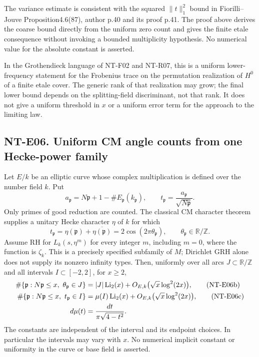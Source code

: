 The variance estimate is consistent with the squared
$\|t\|_1^2$ bound in Fiorilli--Jouve Proposition4.6(87),
author p.40 and its proof p.41. The proof above derives the
coarse bound directly from the uniform zero count and gives
the finite etale consequence without invoking a bounded
multiplicity hypothesis. No numerical value for the absolute
constant is asserted.

In the Grothendieck language of NT-F02 and NT-R07, this is a
uniform lower-frequency statement for the Frobenius trace on
the permutation realization of $H^0$ of a finite etale cover.
The generic rank of that realization may grow; the final lower
bound depends on the splitting-field discriminant, not that
rank. It does not give a uniform threshold in $x$ or a uniform
error term for the approach to the limiting law.

\subsection*{NT-E06. Uniform CM angle counts from one Hecke-power family}
Let $E/k$ be an elliptic curve whose complex multiplication is defined
over the number field $k$. Put
\[
 a_{\mathfrak p}=N\mathfrak p+1-\#E_{\mathfrak p}(k_{\mathfrak p}),
 \qquad t_{\mathfrak p}=\frac{a_{\mathfrak p}}{\sqrt{N\mathfrak p}}.
\]
Only primes of good reduction are counted. The classical CM character
theorem supplies a unitary Hecke character $\eta$ of $k$ for which
\[
 t_{\mathfrak p}=\eta(\mathfrak p)+\overline{\eta(\mathfrak p)}
                =2\cos(2\pi\theta_{\mathfrak p}),
 \qquad \theta_{\mathfrak p}\in\mathbb R/\mathbb Z.       \tag{NT-E06a}
\]
Assume RH for $L_k(s,\eta^m)$ for every integer $m$, including
$m=0$, where the function is $\zeta_k$. This is a precisely specified
subfamily of $M$; Dirichlet GRH alone does not supply its nonzero
infinity types. Then, uniformly over all arcs $J\subset\mathbb R/\mathbb Z$
and all intervals $I\subset[-2,2]$, for $x\ge2$,
\begin{align}
 \#\{\mathfrak p:N\mathfrak p\le x,\ \theta_{\mathfrak p}\in J\}
   &= |J|\operatorname{Li}_2(x)
       +O_{E,k}\bigl(\sqrt x\log^2(2x)\bigr), \tag{NT-E06b}\\
 \#\{\mathfrak p:N\mathfrak p\le x,\ t_{\mathfrak p}\in I\}
   &= \mu(I)\operatorname{Li}_2(x)
       +O_{E,k}\bigl(\sqrt x\log^2(2x)\bigr), \tag{NT-E06c}\\
 d\mu(t)&=\frac{dt}{\pi\sqrt{4-t^2}}.\notag
\end{align}
The constants are independent of the interval and its endpoint choices.
In particular the intervals may vary with $x$. No numerical implicit
constant or uniformity in the curve or base field is asserted.

